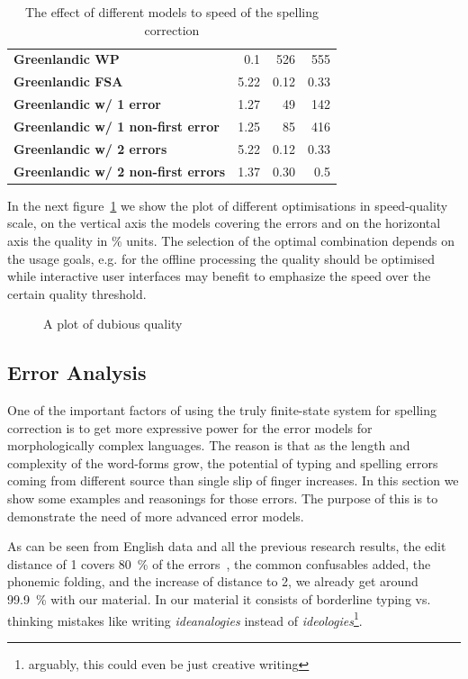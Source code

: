 \documentclass[a4paper,12pt]{article}
\begin{document}
\begin{table}
\begin{tabular}{|l|r|r|r|}
        \hline
        \bf Greenlandic WP    & 0.1  & 526 & 555\\
       \bf Greenlandic FSA    & 5.22 & 0.12 & 0.33 \\
        \hline
        \bf Greenlandic w/ 1 error    & 1.27 & 49 & 142 \\
\bf Greenlandic w/ 1 non-first error  & 1.25 & 85 & 416 \\
       \bf Greenlandic w/ 2 errors    & 5.22 & 0.12 & 0.33 \\
\bf Greenlandic w/ 2 non-first errors & 1.37 & 0.30 & 0.5 \\
        \hline
    \end{tabular}
    \caption{The effect of different models to speed of the spelling
        correction \label{table:speed}}
\end{table}

In the next figure~\ref{fig:speed-quality} we show the plot of
different optimisations in speed-quality scale, on the vertical axis the models
covering the errors and on the horizontal axis the quality in \% units. The
selection of the optimal combination depends on the usage goals, e.g. for the
offline processing the quality should be optimised while interactive user
interfaces may benefit to emphasize the speed over the certain quality
threshold.

\begin{figure}
    \centering
    \caption{A plot of dubious quality
    \label{fig:speed-quality}}
\end{figure}

\subsection{Error Analysis}
\label{subsec:error-analysis}

One of the important factors of using the truly finite-state system for
spelling correction is to get more expressive power for the error models for
morphologically complex languages. The reason is that as the length and
complexity of the word-forms grow, the potential of typing and spelling errors
coming from different source than single slip of finger increases. In this
section we show some examples and reasonings for those errors. The purpose of
this is to demonstrate the need of more advanced error models.

As can be seen from English data and all the previous research results, the
edit distance of 1 covers 80~\% of the errors~\cite{damerau/1964}, the common
confusables added, the phonemic folding, and the increase of distance to 2, we
already get around 99.9~\% with our material. In our material it consists of
borderline typing vs. thinking mistakes like writing \emph{ideanalogies}
instead of \emph{ideologies}\footnote{arguably, this could even be just
creative writing}.
\end{document}
